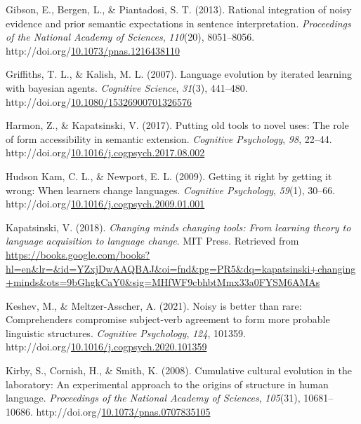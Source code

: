 \documentclass[10pt, letterpaper]{article}
\newenvironment{CSLReferences}%
  {}%
  {\par}
\begin{document}
\begin{CSLReferences}{1}{0}
\leavevmode{}%
Gibson, E., Bergen, L., \& Piantadosi, S. T. (2013). Rational
integration of noisy evidence and prior semantic expectations in
sentence interpretation. \emph{Proceedings of the National Academy of
Sciences}, \emph{110}(20), 8051--8056.
http://doi.org/\href{https://doi.org/10.1073/pnas.1216438110}{10.1073/pnas.1216438110}

\leavevmode{}%
Griffiths, T. L., \& Kalish, M. L. (2007). Language evolution by
iterated learning with bayesian agents. \emph{Cognitive Science},
\emph{31}(3), 441--480.
http://doi.org/\href{https://doi.org/10.1080/15326900701326576}{10.1080/15326900701326576}

\leavevmode{}%
Harmon, Z., \& Kapatsinski, V. (2017). Putting old tools to novel uses:
The role of form accessibility in semantic extension. \emph{Cognitive
Psychology}, \emph{98}, 22--44.
http://doi.org/\href{https://doi.org/10.1016/j.cogpsych.2017.08.002}{10.1016/j.cogpsych.2017.08.002}

\leavevmode{}%
Hudson Kam, C. L., \& Newport, E. L. (2009). Getting it right by getting
it wrong: When learners change languages. \emph{Cognitive Psychology},
\emph{59}(1), 30--66.
http://doi.org/\href{https://doi.org/10.1016/j.cogpsych.2009.01.001}{10.1016/j.cogpsych.2009.01.001}

\leavevmode{}%
Kapatsinski, V. (2018). \emph{Changing minds changing tools: From
learning theory to language acquisition to language change}. MIT Press.
Retrieved from
\url{https://books.google.com/books?hl=en\&lr=\&id=YZxjDwAAQBAJ\&oi=fnd\&pg=PR5\&dq=kapatsinski+changing+minds\&ots=9bGhgkCaY0\&sig=MHfWF9cbhbtMmx33a0FYSM6AMAs}

\leavevmode{}%
Keshev, M., \& Meltzer-Asscher, A. (2021). Noisy is better than rare:
Comprehenders compromise subject-verb agreement to form more probable
linguistic structures. \emph{Cognitive Psychology}, \emph{124}, 101359.
http://doi.org/\href{https://doi.org/10.1016/j.cogpsych.2020.101359}{10.1016/j.cogpsych.2020.101359}

\leavevmode{}%
Kirby, S., Cornish, H., \& Smith, K. (2008). Cumulative cultural
evolution in the laboratory: An experimental approach to the origins of
structure in human language. \emph{Proceedings of the National Academy
of Sciences}, \emph{105}(31), 10681--10686.
http://doi.org/\href{https://doi.org/10.1073/pnas.0707835105}{10.1073/pnas.0707835105}


\end{CSLReferences}
\end{document}
